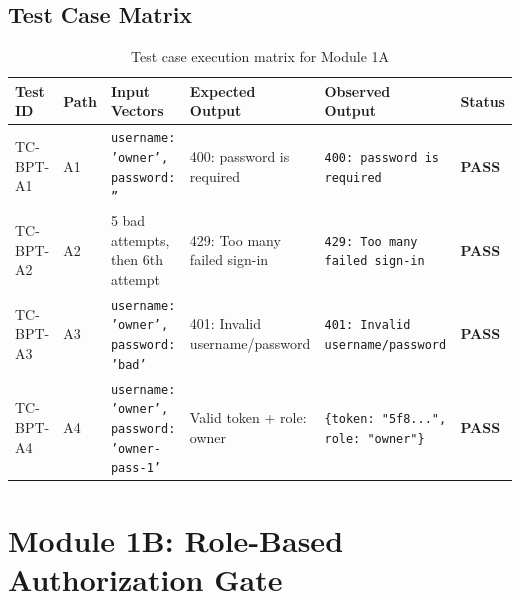 \documentclass[12pt, a4paper]{report}
\begin{document}
\section{Test Case Matrix}
\begin{table}[H]
\centering
\footnotesize
\begin{tabularx}{\textwidth}{L{2.0cm} C{1.0cm} L{3.8cm} L{3.5cm} L{3.5cm} C{1.2cm}}
\toprule
\textbf{Test ID} & \textbf{Path} & \textbf{Input Vectors} & \textbf{Expected Output} & \textbf{Observed Output} & \textbf{Status} \\
\midrule
TC-BPT-A1 & A1 & \texttt{username: 'owner', password: ''} & 400: password is required & \texttt{400: password is required} & \textbf{PASS} \\
TC-BPT-A2 & A2 & 5 bad attempts, then 6th attempt & 429: Too many failed sign-in & \texttt{429: Too many failed sign-in} & \textbf{PASS} \\
TC-BPT-A3 & A3 & \texttt{username: 'owner', password: 'bad'} & 401: Invalid username/password & \texttt{401: Invalid username/password} & \textbf{PASS} \\
TC-BPT-A4 & A4 & \texttt{username: 'owner', password: 'owner-pass-1'} & Valid token + role: owner & \texttt{\{token: "5f8...", role: "owner"\}} & \textbf{PASS} \\
\bottomrule
\end{tabularx}
\caption{Test case execution matrix for Module 1A}
\label{tab:matrix_1a}
\end{table}

\chapter{Module 1B: Role-Based Authorization Gate}
\end{document}
